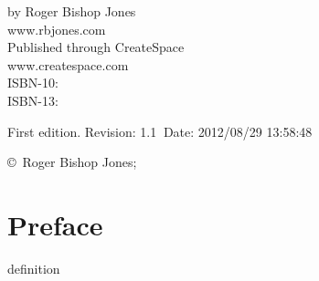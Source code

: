 \frontmatter

\begin{titlepage}
\maketitle

\hspace{2in}

\vfill

\begin{centering}

\vfill

\vspace{0.1in}
by Roger Bishop Jones\\
www.rbjones.com\\
\vspace{0.2in}
Published through CreateSpace\\
www.createspace.com\\
\vspace{0.2in}
ISBN-10: \\
ISBN-13: \\
\vspace{0.2in}

{\footnotesize

First edition. $ $Revision: 1.1 $~$Date: 2012/08/29 13:58:48 $ $

\copyright\ Roger Bishop Jones;

}%

\end{centering}

\thispagestyle{empty}
\end{titlepage}

{\parskip=0pt\tableofcontents}

\vfill

\pagebreak

\chapter*{Preface}

\mainmatter


\backmatter

%
%



\gls{definition}
\glsaddall

\printglossaries

\printindex

\vfil



